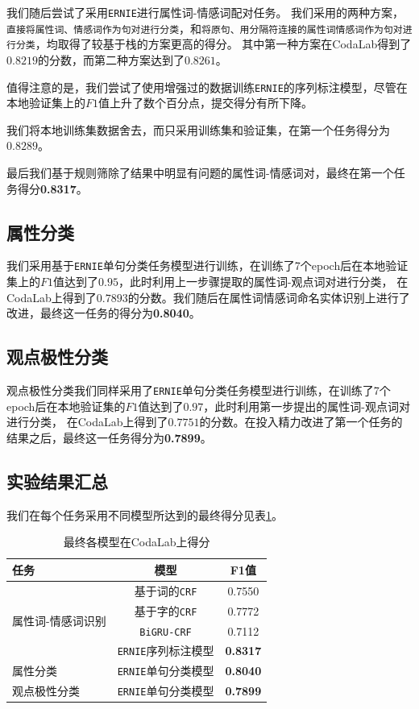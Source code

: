 \documentclass[11pt,a4paper]{article}
\begin{document}
我们随后尝试了采用\texttt{ERNIE}进行属性词-情感词配对任务。
我们采用的两种方案，\texttt{直接将属性词、情感词作为句对进行分类}，和\texttt{将原句、用分隔符连接的属性词情感词作为句对进行分类}，均取得了较基于栈的方案更高的得分。
其中第一种方案在CodaLab得到了$0.8219$的分数，而第二种方案达到了$0.8261$。

值得注意的是，我们尝试了使用增强过的数据训练\texttt{ERNIE}的序列标注模型，尽管在本地验证集上的$F1$值上升了数个百分点，提交得分有所下降。

我们将本地训练集数据舍去，而只采用训练集和验证集，在第一个任务得分为$0.8289$。

最后我们基于规则筛除了结果中明显有问题的属性词-情感词对，最终在第一个任务得分\textbf{0.8317}。

\subsection{属性分类}
我们采用基于\texttt{ERNIE}单句分类任务模型进行训练，在训练了7个epoch后在本地验证集上的$F1$值达到了$0.95$，此时利用上一步骤提取的属性词-观点词对进行分类，
在CodaLab上得到了$0.7893$的分数。我们随后在属性词情感词命名实体识别上进行了改进，最终这一任务的得分为\textbf{0.8040}。

\subsection{观点极性分类}
观点极性分类我们同样采用了\texttt{ERNIE}单句分类任务模型进行训练，在训练了7个epoch后在本地验证集的$F1$值达到了$0.97$，此时利用第一步提出的属性词-观点词对进行分类，
在CodaLab上得到了$0.7751$的分数。在投入精力改进了第一个任务的结果之后，最终这一任务得分为\textbf{0.7899}。

\subsection{实验结果汇总}
我们在每个任务采用不同模型所达到的最终得分见表\ref{table:score}。

\begin{table}[!h]
  \centering
  \begin{tabular}{|p{1.7cm}|c|c|}
  \hline \textbf{任务} & \textbf{模型} & \textbf{F1值}  \\ \hline
  \multirow{4}{1.7cm}{属性词-情感词识别} & 基于词的\texttt{CRF} & 0.7550 \\ \cline{2-3}
  & 基于字的\texttt{CRF} & 	0.7772 \\ \cline{2-3}
  & \texttt{BiGRU-CRF} & 0.7112 \\ \cline{2-3}
  & \texttt{ERNIE}序列标注模型 & \textbf{0.8317} \\ \hline
  属性分类 & \texttt{ERNIE}单句分类模型 & \textbf{0.8040} \\ \hline
  观点极性分类 & \texttt{ERNIE}单句分类模型 & \textbf{0.7899} \\ 
  \hline
  \end{tabular}
  \caption{\label{table:score} 最终各模型在CodaLab上得分 }
\end{table}
\end{document}
